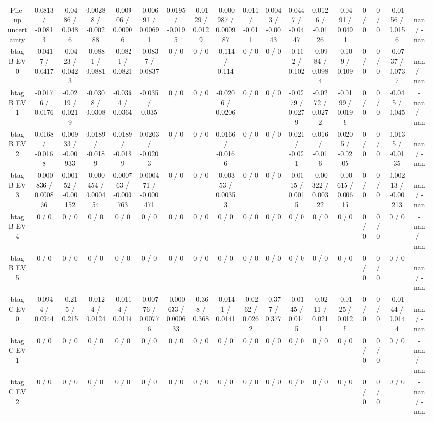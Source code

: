 \documentclass[10pt]{article}
\begin{document}
\begin{table}[htbp]
\begin{center}
\begin{tabular}{|c|c|c|c|c|c|c|c|c|c|c|c|c|c|c|c|c|c|}
  Pile-up uncertainty & 0.0813 / -0.0813 & -0.0486 / 0.0486 & 0.00288 / -0.00288 & -0.00906 / 0.00906 & -0.00691 / 0.00691 & 0.0195 / -0.0195 & -0.0129 / 0.0129 & -0.000987 / 0.000987 & 0.011 / -0.011 & 0.0043 / -0.0043 & 0.0447 / -0.0447 & 0.0126 / -0.0126 & -0.0491 / 0.0491 & 0 / 0 & 0 / 0 & -0.0156 / 0.0156 & -nan / -nan \\ 
  btag B EV 0 & -0.0417 / 0.0417 & -0.0423 / 0.0423 & -0.0881 / 0.0881 & -0.0821 / 0.0821 & -0.0837 / 0.0837 & 0 / 0 & 0 / 0 & -0.114 / 0.114 & 0 / 0 & 0 / 0 & -0.102 / 0.102 & -0.0984 / 0.0984 & -0.109 / 0.109 & 0 / 0 & 0 / 0 & -0.0737 / 0.0737 & -nan / -nan \\ 
  btag B EV 1 & -0.0176 / 0.0176 & -0.0219 / 0.0219 & -0.0308 / 0.0308 & -0.0364 / 0.0364 & -0.035 / 0.035 & 0 / 0 & 0 / 0 & -0.0206 / 0.0206 & 0 / 0 & 0 / 0 & -0.0279 / 0.0279 & -0.0272 / 0.0272 & -0.0199 / 0.0199 & 0 / 0 & 0 / 0 & -0.045 / 0.045 & -nan / -nan \\ 
  btag B EV 2 & 0.0168 / -0.0168 & 0.00933 / -0.00933 & 0.0189 / -0.0189 & 0.0189 / -0.0189 & 0.0203 / -0.0203 & 0 / 0 & 0 / 0 & 0.0166 / -0.0166 & 0 / 0 & 0 / 0 & 0.021 / -0.021 & 0.016 / -0.016 & 0.0205 / -0.0205 & 0 / 0 & 0 / 0 & 0.0135 / -0.0135 & -nan / -nan \\ 
  btag B EV 3 & -0.000836 / 0.000836 & 0.00152 / -0.00152 & -0.000454 / 0.000454 & 0.000763 / -0.000763 & 0.000471 / -0.000471 & 0 / 0 & 0 / 0 & -0.00353 / 0.00353 & 0 / 0 & 0 / 0 & -0.0015 / 0.0015 & -0.00322 / 0.00322 & -0.00615 / 0.00615 & 0 / 0 & 0 / 0 & 0.00213 / -0.00213 & -nan / -nan \\ 
  btag B EV 4 & 0 / 0 & 0 / 0 & 0 / 0 & 0 / 0 & 0 / 0 & 0 / 0 & 0 / 0 & 0 / 0 & 0 / 0 & 0 / 0 & 0 / 0 & 0 / 0 & 0 / 0 & 0 / 0 & 0 / 0 & 0 / 0 & -nan / -nan \\ 
  btag B EV 5 & 0 / 0 & 0 / 0 & 0 / 0 & 0 / 0 & 0 / 0 & 0 / 0 & 0 / 0 & 0 / 0 & 0 / 0 & 0 / 0 & 0 / 0 & 0 / 0 & 0 / 0 & 0 / 0 & 0 / 0 & 0 / 0 & -nan / -nan \\ 
  btag C EV 0 & -0.0944 / 0.0944 & -0.215 / 0.215 & -0.0124 / 0.0124 & -0.0114 / 0.0114 & -0.00776 / 0.00776 & -0.000633 / 0.000633 & -0.368 / 0.368 & -0.0141 / 0.0141 & -0.0262 / 0.0262 & -0.377 / 0.377 & -0.0145 / 0.0145 & -0.0211 / 0.0211 & -0.0125 / 0.0125 & 0 / 0 & 0 / 0 & -0.0144 / 0.0144 & -nan / -nan \\ 
  btag C EV 1 & 0 / 0 & 0 / 0 & 0 / 0 & 0 / 0 & 0 / 0 & 0 / 0 & 0 / 0 & 0 / 0 & 0 / 0 & 0 / 0 & 0 / 0 & 0 / 0 & 0 / 0 & 0 / 0 & 0 / 0 & 0 / 0 & -nan / -nan \\ 
  btag C EV 2 & 0 / 0 & 0 / 0 & 0 / 0 & 0 / 0 & 0 / 0 & 0 / 0 & 0 / 0 & 0 / 0 & 0 / 0 & 0 / 0 & 0 / 0 & 0 / 0 & 0 / 0 & 0 / 0 & 0 / 0 & 0 / 0 & -nan / -nan \\ 

\end{tabular}
\end{center}
\end{table}
\end{document}

